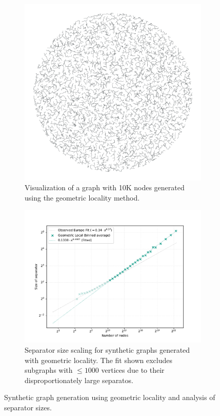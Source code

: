 \begin{figure}[tbhp]
	\begin{subfigure}{0.35\linewidth}
		\centering
		\includegraphics[width=\linewidth]{graphics/local_embedding.png}
		\caption{Visualization of a graph with 10K nodes generated using the geometric locality method.}
		\label{fig:geometric_locality_graph_viz}
	\end{subfigure}
	\hfill
	\begin{subfigure}{0.55\linewidth}
		\centering
		\includegraphics[width=\linewidth]{graphics/sep_local_embedding.pdf}
		\caption{Separator size scaling for synthetic graphs generated with geometric locality. The fit shown excludes subgraphs with \( \le 1000 \) vertices due to their disproportionately large separatos. }
		\label{fig:geometric_locality_sep_plot}
	\end{subfigure}
	\caption{Synthetic graph generation using geometric locality and analysis of separator sizes. }
	\label{fig:geometric_locality_separators}
\end{figure}

